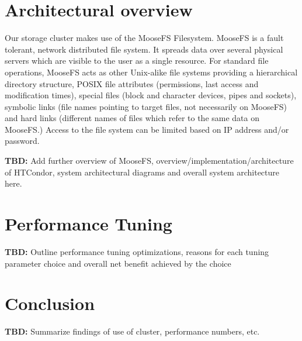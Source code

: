 \documentclass[a4paper, 10pt]{paper}
\begin{document}
\section{Architectural overview}
Our storage cluster makes use of the MooseFS Filesystem.  MooseFS is a fault tolerant, network distributed file system. It spreads data over several physical servers which are visible to the user as a single resource. For standard file operations, MooseFS acts as other Unix-alike file systems providing a hierarchical directory structure, POSIX file attributes (permissions, last access and modification times), special files (block and character devices, pipes and sockets), symbolic links (file names pointing to target files, not necessarily on MooseFS) and hard links (different names of files which refer to the same data on MooseFS.)  Access to the file system can be limited based on IP address and/or password.

\textbf{TBD:} Add further overview of MooseFS, overview/implementation/architecture of HTCondor, system architectural diagrams and overall system architecture here.
\section{Performance Tuning}
\textbf{TBD:} Outline performance tuning optimizations, reasons for each tuning parameter choice and overall net benefit achieved by the choice
\section{Conclusion}
\textbf{TBD:} Summarize findings of use of cluster, performance numbers, etc.
\end{document}
